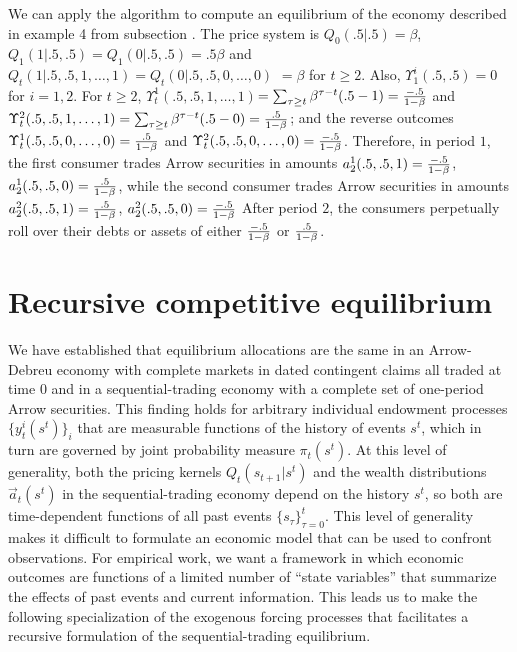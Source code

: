 \medskip


We can apply the algorithm to compute an equilibrium of the economy described in  example 4 from subsection . 
The price system is $Q_0(.5\big|.5) =\beta$, 
$Q_1(1\big|.5,.5) = Q_1(0\big|.5,.5) = .5 \beta$  and
$Q_t(1\big|.5,.5,1,\ldots,1) = Q_t(0\big|.5,.5,0,\ldots,0)$ 
$= \beta $ for $t \geq 2$.
Also, $\Upsilon^i_1(.5,.5)= 0$ for $i=1,2$.  For $t \geq 2$,
$\Upsilon_t^1 (.5,.5,1, \ldots,1)$$= \sum_{\tau \geq t} \beta^{\tau - t}(.5 -1) = {-.5 \over 1-\beta}$ and
$\Upsilon_t^2(.5,.5,1, \ldots,1) = \sum_{\tau \geq t} \beta^{\tau - t}(.5 -0) = {.5 \over 1-\beta}$; and
the reverse outcomes  
$\Upsilon_t^1 (.5,.5,0, \ldots,0)= {.5 \over 1-\beta}$ and
$\Upsilon_t^2 (.5,.5,0, \ldots,0)= {-.5 \over 1-\beta}$.
Therefore, in period $1$, the first  consumer trades Arrow securities in amounts $a_2^1(.5,.5,1) = {-.5 \over 1-\beta}$,
$a_2^1(.5,.5,0) = {.5 \over 1-\beta}$, while the second consumer trades  Arrow securities in amounts 
$a_2^2(.5,.5,1) = {.5 \over 1-\beta}$,
$a_2^2(.5,.5,0) = {-.5 \over 1-\beta}$   After period $2$, the consumers perpetually roll over their debts or assets of either
${-.5 \over 1-\beta}$ or ${.5 \over 1 - \beta}$.






\section{Recursive competitive equilibrium}\label{sec:Markovs}%
We have established that  equilibrium allocations are the same
in an Arrow-Debreu economy with  complete markets in dated
contingent claims all traded at time 0 and in a sequential-trading
economy with a complete set of one-period Arrow securities. This finding
holds for arbitrary individual endowment processes
$\{y^i_t(s^t)\}_i$ that are measurable functions of the history of
events $s^t$, which in turn are governed by joint
probability measure $\pi_t(s^t)$. At this level of generality, both 
 the pricing kernels $Q_t(s_{t+1} | s^t)$ and the
wealth distributions $\vec {a}_t(s^t)$ in the
sequential-trading economy  depend on the history $s^t$, so both
 are time-dependent functions of all past events
$\{s_\tau\}_{\tau=0}^t$. This level of generality  makes it  difficult to
formulate an economic model that can be used to confront
observations. For empirical work, we want  a framework in which economic outcomes
are functions of a limited number of ``state variables'' that
summarize the effects of past events and current information. This
 leads us to make the following specialization of the
exogenous forcing processes that facilitates a recursive formulation
of the sequential-trading equilibrium.


